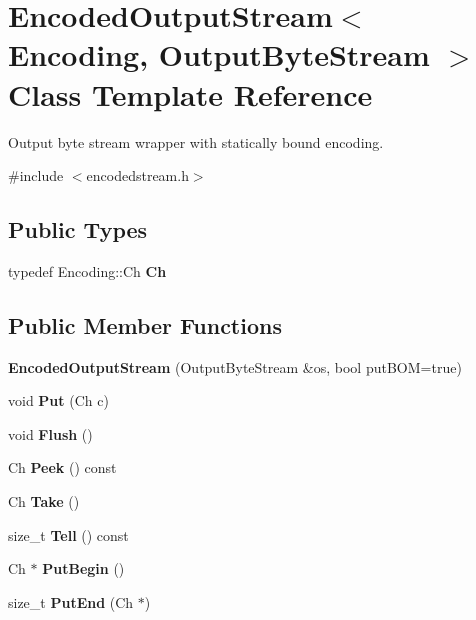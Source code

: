 \hypertarget{a02132}{}\section{Encoded\+Output\+Stream$<$ Encoding, Output\+Byte\+Stream $>$ Class Template Reference}
\label{a02132}


Output byte stream wrapper with statically bound encoding.  




{\ttfamily \#include $<$encodedstream.\+h$>$}

\subsection*{Public Types}
\begin{DoxyCompactItemize}
\item 
\mbox{\label{a02132_aa8f494d7ee2808307fbc9cd658c0f760}} 
typedef Encoding\+::\+Ch {\bfseries Ch}
\end{DoxyCompactItemize}
\subsection*{Public Member Functions}
\begin{DoxyCompactItemize}
\item 
\mbox{\label{a02132_ad3360c613a30a6a15526ae9ad63bd004}} 
{\bfseries Encoded\+Output\+Stream} (Output\+Byte\+Stream \&os, bool put\+B\+OM=true)
\item 
\mbox{\label{a02132_a0f3c00f94c195a38d78c05ecda497481}} 
void {\bfseries Put} (Ch c)
\item 
\mbox{\label{a02132_a657188f6a9f0fae01a4012c288d3fd46}} 
void {\bfseries Flush} ()
\item 
\mbox{\label{a02132_a22e00087e16ad7a12438fb34fb562bb7}} 
Ch {\bfseries Peek} () const
\item 
\mbox{\label{a02132_a90f5a5e1598316a417ef5b6ad3d49f36}} 
Ch {\bfseries Take} ()
\item 
\mbox{\label{a02132_a1c6f6d51999b8d04e4d81d92ff725dbc}} 
size\+\_\+t {\bfseries Tell} () const
\item 
\mbox{\label{a02132_a78934de4f76c9fa65238e65d3630cbc5}} 
Ch $\ast$ {\bfseries Put\+Begin} ()
\item 
\mbox{\label{a02132_a818695f6d3fa8896e9d7d0fbdc7d4514}} 
size\+\_\+t {\bfseries Put\+End} (Ch $\ast$)
\end{DoxyCompactItemize}


